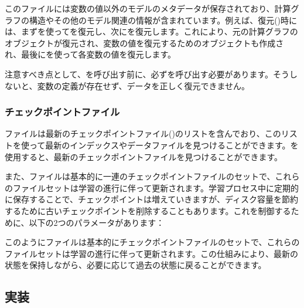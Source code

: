 \begin{content}
このファイルには変数の値以外のモデルのメタデータが保存されており、計算グラフの構造やその他のモデル関連の情報が含まれています。例えば、復元()時には、まずを使ってを復元し、次にを復元します。これにより、元の計算グラフのオブジェクトが復元され、変数の値を復元するためのオブジェクトも作成され、最後にを使って各変数の値を復元します。

注意すべき点として、を呼び出す前に、必ずを呼び出す必要があります。そうしないと、変数の定義が存在せず、データを正しく復元できません。

\subsubsection{チェックポイントファイル}

ファイルは最新のチェックポイントファイル()のリストを含んでおり、このリストを使って最新のインデックスやデータファイルを見つけることができます。を使用すると、最新のチェックポイントファイルを見つけることができます。

また、ファイルは基本的に一連のチェックポイントファイルのセットで、これらのファイルセットは学習の進行に伴って更新されます。学習プロセス中に定期的に保存することで、チェックポイントは増えていきますが、ディスク容量を節約するために古いチェックポイントを削除することもあります。これを制御するために、以下の2つのパラメータがあります：

\begin{enum}
\end{enum}

このようにファイルは基本的にチェックポイントファイルのセットで、これらのファイルセットは学習の進行に伴って更新されます。この仕組みにより、最新の状態を保持しながら、必要に応じて過去の状態に戻ることができます。

\subsection{実装}


\end{content}
